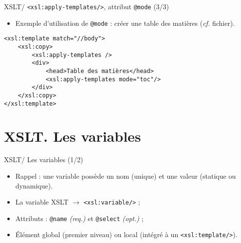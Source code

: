 \documentclass{beamer}
\begin{document}
    \begin{frame}[fragile]{XSLT/ \texttt{<xsl:apply-templates/>}, attribut \texttt{@mode} (3/3)}
        \Large
        \begin{itemize}
            \item Exemple d'utilisation de \texttt{@mode} : créer une table des matières (\textit{cf.} fichier).
        \end{itemize}
        \normalsize
        \begin{verbatim}
<xsl:template match="//body">
    <xsl:copy>
        <xsl:apply-templates />
        <div>
            <head>Table des matières</head>
            <xsl:apply-templates mode="toc"/>
        </div>
    </xsl:copy>
</xsl:template>
        \end{verbatim}
    \end{frame}

    \section{XSLT. Les variables}

    \begin{frame}{XSLT/ Les variables (1/2)}
        \Large
        \begin{itemize}
            \item Rappel : une variable possède un nom (unique) et une valeur (statique ou dynamique).
            \bigskip
            \item La variable XSLT $\rightarrow$ \texttt{<xsl:variable/>} ;
            \item Attributs : \texttt{@name} \textit{(req.)} et \texttt{@select} \textit{(opt.)} ;
            \item Élément global (premier niveau) ou local (intégré à un \texttt{<xsl:template/>}).
        \end{itemize}
    \end{frame}
\end{document}
